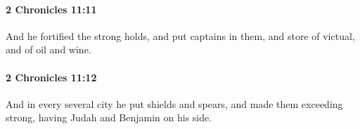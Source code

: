 		\paragraph{2 Chronicles 11:11} %
			\label{2CHRONICLES-11-11}

			And he fortified the strong holds, and put captains in them, and store of victual, and of oil and wine.


		\paragraph{2 Chronicles 11:12} %
			\label{2CHRONICLES-11-12}

			And in every several city he put shields and spears, and made them exceeding strong, having Judah and Benjamin on his side.


